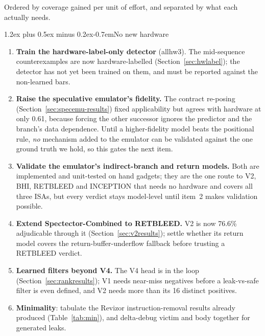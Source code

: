 \documentclass[conference]{IEEEtran}
\makeatletter
\renewcommand\paragraph{\@startsection{paragraph}{4}{\z@}%
  {1.2ex plus 0.5ex minus 0.2ex}{-0.7em}{\normalfont\normalsize\bfseries}}
\makeatother
\begin{document}
Ordered by coverage gained per unit of effort, and separated by what each
actually needs.

\paragraph{No new hardware}
\begin{enumerate}[itemsep=1pt,leftmargin=1.4em]
  \item \textbf{Train the hardware-label-only detector} (allhw3). The
    mid-sequence counterexamples are now hardware-labelled
    (Section~\ref{sec:hwlabel}); the detector has not yet been trained on
    them, and must be reported against the non-learned bars.
  \item \textbf{Raise the speculative emulator's fidelity.} The contract
    re-posing (Section~\ref{sec:specemu-results}) fixed applicability but
    agrees with hardware at only 0.61, because forcing the other successor
    ignores the predictor and the branch's data dependence. Until a
    higher-fidelity model beats the positional rule, \emph{no} mechanism added
    to the emulator can be validated against the one ground truth we hold, so
    this gates the next item.
  \item \textbf{Validate the emulator's indirect-branch and return models.}
    Both are implemented and unit-tested on hand gadgets; they are the one
    route to V2, BHI, RETBLEED and INCEPTION that needs no hardware and covers
    all three ISAs, but every verdict stays model-level until item~2 makes
    validation possible.
  \item \textbf{Extend Spectector-Combined to RETBLEED.} V2 is now 76.6\%
    adjudicable through it (Section~\ref{sec:v2results}); settle whether its
    return model covers the return-buffer-underflow fallback before trusting a
    RETBLEED verdict.
  \item \textbf{Learned filters beyond V4.} The V4 head is in the loop
    (Section~\ref{sec:rankresults}); V1 needs near-miss negatives before a
    leak-vs-safe filter is even defined, and V2 needs more than its 16 distinct
    positives.
  \item \textbf{Minimality}: tabulate the Revizor instruction-removal results
    already produced (Table~\ref{tab:min}), and delta-debug victim and body
    together for generated leaks.
\end{enumerate}
\end{document}
